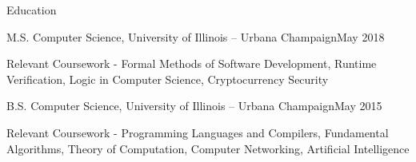 \documentclass{resume} %
\begin{document}

\begin{rSection}{Education}
\begin{rSubsection}{ M.S. Computer Science, University of Illinois -- Urbana Champaign}{May 2018}{}{}
\item Relevant Coursework - Formal Methods of Software Development, Runtime Verification, Logic in Computer Science, Cryptocurrency Security 
\end{rSubsection}
\begin{rSubsection}{ B.S. Computer Science, University of Illinois -- Urbana Champaign}{May 2015}{}{}
\item Relevant Coursework - Programming Languages and Compilers, Fundamental Algorithms, Theory of Computation, Computer Networking, Artificial Intelligence
\end{rSubsection}
\end{rSection}
\end{document}
